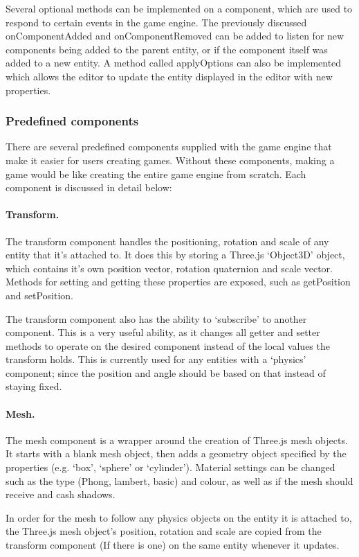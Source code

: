 	Several optional methods can be implemented on a component, which are used to respond to certain events in the game engine. The previously discussed onComponentAdded and onComponentRemoved can be added to listen for new components being added to the parent entity, or if the component itself was added to a new entity. A method called applyOptions can also be implemented which allows the editor to update the entity displayed in the editor with new properties.

	\subsubsection{Predefined components}
	There are several predefined components supplied with the game engine that make it easier for users creating games. Without these components, making a game would be like creating the entire game engine from scratch. Each component is discussed in detail below:

	\paragraph{Transform.}
	The transform component handles the positioning, rotation and scale of any entity that it's attached to. It does this by storing a Three.js `Object3D' object, which contains it's own position vector, rotation quaternion and scale vector. Methods for setting and getting these properties are exposed, such as getPosition and setPosition. 

	The transform component also has the ability to `subscribe' to another component. This is a very useful ability, as it changes all getter and setter methods to operate on the desired component instead of the local values the transform holds. This is currently used for any entities with a `physics' component; since the position and angle should be based on that instead of staying fixed.

	\paragraph{Mesh.}
	The mesh component is a wrapper around the creation of Three.js mesh objects. It starts with a blank mesh object, then adds a geometry object specified by the properties (e.g. `box', `sphere' or `cylinder'). Material settings can be changed such as the type (Phong, lambert, basic) and colour, as well as if the mesh should receive and cash shadows.

	In order for the mesh to follow any physics objects on the entity it is attached to, the Three.js mesh object's position, rotation and scale are copied from the transform component (If there is one) on the same entity whenever it updates.

